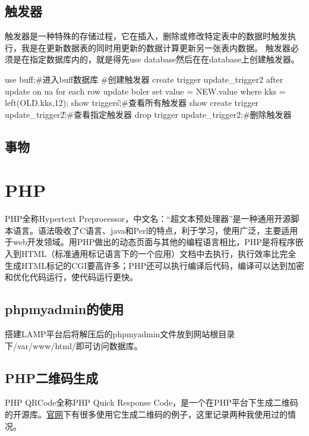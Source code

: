 \subsection{触发器}
触发器是一种特殊的存储过程，它在插入，删除或修改特定表中的数据时触发执行，我是在更新数据表的同时用更新的数据计算更新另一张表内数据。
触发器必须是在指定数据库内的，就是得先use database然后在在database上创建触发器。
\begin{shell}
use buff;#进入buff数据库
#创建触发器
create trigger update_trigger2 after update on ua for each row update boler set value = NEW.value where kks = left(OLD.kks,12);
show triggers\G;#查看所有触发器
show create trigger update_trigger2\G;#查看指定触发器
drop trigger update_trigger2;#删除触发器
\end{shell}
\subsection{事物}

\section{PHP}
PHP全称Hypertext Preprocessor，中文名：“超文本预处理器”是一种通用开源脚本语言。语法吸收了C语言、java和Perl的特点，利于学习，使用广泛，主要适用于web开发领域。用PHP做出的动态页面与其他的编程语言相比，PHP是将程序嵌入到HTML（标准通用标记语言下的一个应用）文档中去执行，执行效率比完全生成HTML标记的CGI要高许多；PHP还可以执行编译后代码，编译可以达到加密和优化代码运行，使代码运行更快。
\subsection{phpmyadmin的使用}
搭建LAMP平台后将解压后的phpmyadmin文件放到网站根目录下/var/www/html/即可访问数据库。
\subsection{PHP二维码生成}
PHP QRCode全称PHP Quick Response Code，是一个在PHP平台下生成二维码的开源库。\href{https://phpqrcode.sourceforge.net/}{官网}下有很多使用它生成二维码的例子，这里记录两种我使用过的情况。
